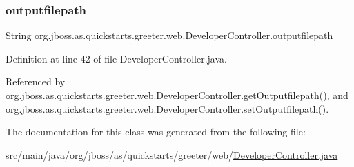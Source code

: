 \subsubsection{\texorpdfstring{outputfilepath}{outputfilepath}}
{\footnotesize\ttfamily String org.\+jboss.\+as.\+quickstarts.\+greeter.\+web.\+Developer\+Controller.\+outputfilepath\hspace{0.3cm}{\ttfamily [private]}}



Definition at line 42 of file Developer\+Controller.\+java.



Referenced by org.\+jboss.\+as.\+quickstarts.\+greeter.\+web.\+Developer\+Controller.\+get\+Outputfilepath(), and org.\+jboss.\+as.\+quickstarts.\+greeter.\+web.\+Developer\+Controller.\+set\+Outputfilepath().



The documentation for this class was generated from the following file\+:\begin{DoxyCompactItemize}
\item 
src/main/java/org/jboss/as/quickstarts/greeter/web/\hyperlink{_developer_controller_8java}{Developer\+Controller.\+java}\end{DoxyCompactItemize}
